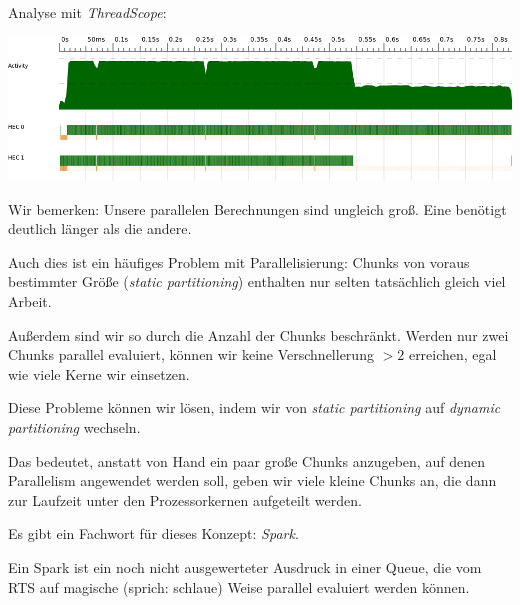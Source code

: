 \documentclass{beamer}
\begin{document}

\begin{frame}
Analyse mit \emph{ThreadScope}:\smallskip

\begin{center}
\includegraphics[scale=0.7]{threadscope.png}
\end{center}
\pause

Wir bemerken: Unsere parallelen Berechnungen sind ungleich groß. Eine benötigt deutlich länger als die andere.\pause

Auch dies ist ein häufiges Problem mit Parallelisierung: Chunks von voraus bestimmter Größe (\emph{static partitioning}) enthalten nur selten tatsächlich gleich viel Arbeit.\pause\smallskip

Außerdem sind wir so durch die Anzahl der Chunks beschränkt. Werden nur zwei Chunks parallel evaluiert, können wir keine Verschnellerung $>2$ erreichen, egal wie viele Kerne wir einsetzen.
\end{frame}


\begin{frame}
Diese Probleme können wir lösen, indem wir von \emph{static partitioning} auf \emph{dynamic partitioning} wechseln.\smallskip

Das bedeutet, anstatt von Hand ein paar große Chunks anzugeben, auf denen Parallelism
angewendet werden soll, geben wir viele kleine Chunks an, die dann zur Laufzeit unter den Prozessorkernen aufgeteilt werden.\bigskip\pause

Es gibt ein Fachwort für dieses Konzept: \emph{Spark}.

Ein Spark ist ein noch nicht ausgewerteter Ausdruck in einer Queue, die vom RTS auf magische (sprich: schlaue) Weise parallel evaluiert werden können.
\end{frame}

\end{document}
